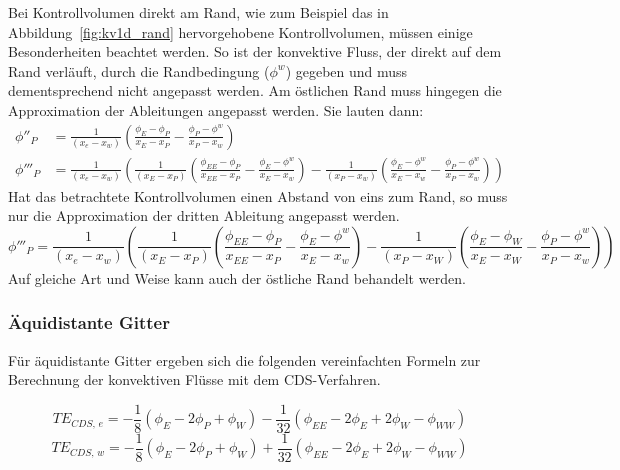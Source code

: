Bei Kontrollvolumen direkt am Rand, wie zum Beispiel das in Abbildung~\ref{fig:kv1d_rand}
hervorgehobene Kontrollvolumen, müssen einige Besonderheiten beachtet werden.
So ist der konvektive Fluss, der direkt auf dem Rand verläuft, durch die Randbedingung ($\phi^w$) gegeben und
muss dementsprechend nicht angepasst werden. Am östlichen Rand muss hingegen die Approximation
der Ableitungen angepasst werden. Sie lauten dann:
\begin{align*}
  \phi''_P &= \frac{1}{(x_e-x_w)} \left({\frac{\phi_E-\phi_P}{x_E-x_P}
  - \frac{\phi_P-\phi^w}{x_P-x_w} }\right)\\
  \phi'''_P &= \frac{1}{(x_e-x_w)} \left({
  \frac{1}{(x_E-x_P)} \left({\frac{\phi_{EE}-\phi_P}{x_{EE}-x_P}- \frac{\phi_E-\phi^w}{x_E-x_w} }\right)-
  \frac{1}{(x_P-x_w)} \left({\frac{\phi_E-\phi^w}{x_E-x_w} - \frac{\phi_P-\phi^{w}}{x_P-x_{w}} }\right)
  }\right)
\end{align*}
Hat das betrachtete Kontrollvolumen  einen Abstand von eins zum Rand, so muss nur die Approximation der dritten
Ableitung angepasst werden.
\begin{equation*}
  \phi'''_P = \frac{1}{(x_e-x_w)} \left({
  \frac{1}{(x_E-x_P)} \left({\frac{\phi_{EE}-\phi_P}{x_{EE}-x_P}- \frac{\phi_E-\phi^w}{x_E-x_w} }\right)-
  \frac{1}{(x_P-x_W)} \left({\frac{\phi_E-\phi_W}{x_E-x_W} - \frac{\phi_P-\phi^{w}}{x_P-x_{w}} }\right)
  }\right)
\end{equation*}
Auf gleiche Art und Weise kann auch der östliche Rand behandelt werden.


\subsubsection{Äquidistante Gitter}

Für äquidistante Gitter ergeben sich die folgenden vereinfachten Formeln zur Berechnung der konvektiven Flüsse
mit dem CDS-Verfahren.

\begin{equation*}
  TE_{CDS,\,e} = -\frac{1}{8} (\phi_E-2\phi_P+\phi_W) - \frac{1}{32}
  (\phi_{EE} - 2\phi_E + 2\phi_W - \phi_{WW})
\end{equation*}
\begin{equation*}
  TE_{CDS,\,w} = -\frac{1}{8} (\phi_E-2\phi_P+\phi_W) + \frac{1}{32}
  (\phi_{EE} - 2\phi_E + 2\phi_W - \phi_{WW})
\end{equation*}








